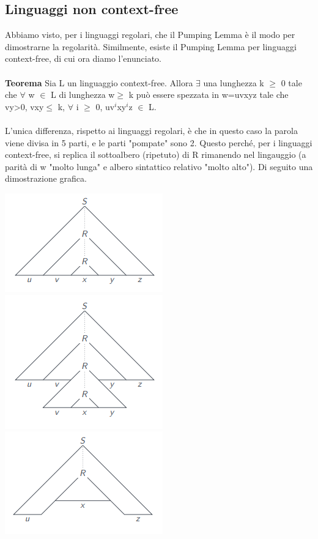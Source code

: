 \documentclass[]{article}
\begin{document}
		\subsection{Linguaggi non context-free}
			Abbiamo visto, per i linguaggi regolari, che il Pumping Lemma è il modo per dimostrarne la regolarità. Similmente, esiste il Pumping Lemma per linguaggi context-free, di cui ora diamo l'enunciato.\\\\
			\textbf{Teorema} Sia L un linguaggio context-free. Allora $\exists$ una lunghezza k $\geq$ 0 tale che $\forall$ w $\in$ L di lunghezza \textbar w\textbar $\geq$ k può essere spezzata in w=uvxyz tale che \textbar vy\textbar \textgreater 0, \textbar vxy\textbar $\leq$ k, $\forall$ i $\geq$ 0, uv$^i$xy$^i$z $\in$ L.\\\\
			L'unica differenza, rispetto ai linguaggi regolari, è che in questo caso la parola viene divisa in 5 parti, e le parti "pompate" sono 2. Questo perché, per i linguaggi context-free, si replica il sottoalbero (ripetuto) di R rimanendo nel lingauggio (a parità di w "molto lunga" e albero sintattico relativo "molto alto"). Di seguito una dimostrazione grafica.
			\begin{center}
				\includegraphics{PLCFG1.png}
				\includegraphics{PLCFG2.png}
				\includegraphics{PLCFG3.png}
			\end{center}
\end{document}
